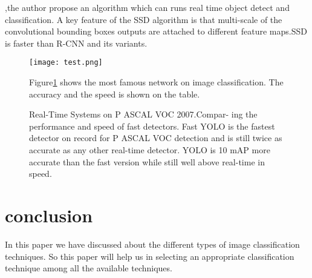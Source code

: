\documentclass[10pt,twocolumn,letterpaper]{article}
\begin{document}
\cite{liu2016ssd},the author propose an algorithm which can runs real time object detect and classification. A key feature of the SSD algorithm is that multi-scale of the convolutional bounding boxes outputs are attached to different feature maps.SSD is faster than R-CNN and its variants.

\begin{figure}[htbp]
	\begin{center}
		\texttt{[image: test.png]}
	\end{center}
	\caption{Real-Time Systems on P ASCAL VOC 2007.Compar-
		ing the performance and speed of fast detectors. Fast YOLO is
		the fastest detector on record for P ASCAL VOC detection and is
		still twice as accurate as any other real-time detector. YOLO is
		10 mAP more accurate than the fast version while still well above
		real-time in speed.}
	\label{fig:lxsfvgong}
	
	Figure\ref{fig:lxsfvgong} shows the most famous network on image classification. The accuracy and the speed is shown on the table.
	
\end{figure}



\section{conclusion}

In this paper we have discussed about the different types of image classification techniques. So this paper will help us in selecting an appropriate classification technique among all the available techniques.


\newpage
{\small


}
\end{document}
